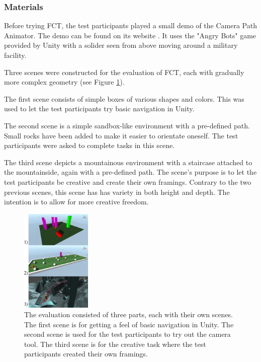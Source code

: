 \subsubsection{Materials}
Before trying FCT, the test participants played a small demo of the Camera Path Animator. The demo can be found on its website \cite{unity_camTool}. It uses the "Angry Bots" game provided by Unity \cite{angryBots} with a solider seen from above moving around a military facility.

Three scenes were constructed for the evaluation of FCT, each with gradually more complex geometry (see Figure \ref{fig:sceneAll}).

The first scene consists of simple boxes of various shapes and colors. This was used to let the test participants try basic navigation in Unity.

The second scene is a simple sandbox-like environment with a pre-defined path. Small rocks have been added to make it easier to orientate oneself. The test participants were asked to complete tasks in this scene.

The third scene depicts a mountainous environment with a staircase attached to the mountainside, again with a pre-defined path. The scene's purpose is to let the test participants be creative and create their own framings. Contrary to the two previous scenes, this scene has has variety in both height and depth. The intention is to allow for more creative freedom.


\begin{figure}[htbp]
\centering
\includegraphics[width=0.3\textwidth]{Pics/sceneAll}
\caption{The evaluation consisted of three parts, each with their own scenes. The first scene is for getting a feel of basic navigation in Unity. The second scene is used for the test participants to try out the camera tool. The third scene is for the creative task where the test participants created their own framings.}
\label{fig:sceneAll}
\end{figure}
